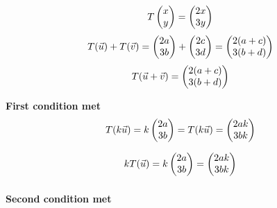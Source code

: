 \documentclass{article}
\begin{document}
\begin{minipage}[c]{.5\linewidth}
		 \[
T
\left(\begin{array}{@{}c@{}}
	x \\
	y \\
\end{array}\right) = 
\left(\begin{array}{@{}c@{}}
	2x \\
	3y \\
\end{array}\right) 
\]
		 \[
T(\vec u) + T(\vec v)= 
\left(\begin{array}{@{}c@{}}
	2a \\
	3b \\
\end{array}\right) +
\left(\begin{array}{@{}c@{}}
	2c \\
	3d \\
\end{array}\right) =
\left(\begin{array}{@{}c@{}}
	2(a + c) \\
	3(b + d) \\
\end{array}\right) 
\]
		 \[
T(\vec u + \vec v) = 
\left(\begin{array}{@{}c@{}}
	2(a+c) \\
	3(b+d) \\
\end{array}\right)
\]
\par\noindent \textbf{First condition met}
\newline
 \[
 T(k \vec u)= 
 k\left(\begin{array}{@{}c@{}}
 	2a \\
 	3b \\
 \end{array}\right) =
 T(k \vec u)= 
\left(\begin{array}{@{}c@{}}
	2ak \\
	3bk \\
\end{array}\right) 
 \]

\[
	kT(\vec u) = k
	\left(\begin{array}{@{}c@{}}
		2a \\
		3b \\
	\end{array}\right) =
 \left(\begin{array}{@{}c@{}}
 	2ak \\
 	3bk \\
 \end{array}\right) 
\]
 \[
 \]
 \par\noindent \textbf{Second condition met}
 
\end{minipage}
\end{document}
